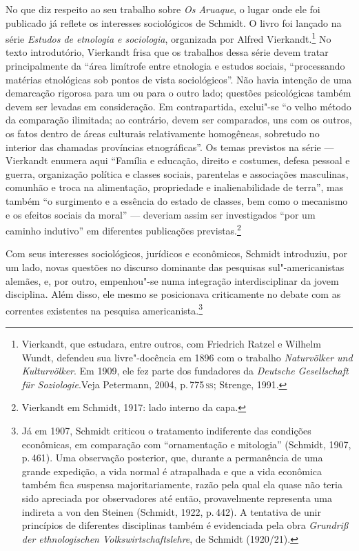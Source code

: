 No que diz respeito ao seu trabalho sobre \textit{Os Aruaque}, o lugar onde
ele foi publicado já reflete os interesses sociológicos de Schmidt. O
livro foi lançado na série \textit{Estudos de etnologia e sociologia}, organizada por
Alfred Vierkandt.\footnote{Vierkandt, que estudara, entre
  outros, com Friedrich Ratzel e Wilhelm Wundt, defendeu sua
  livre"-docência em 1896 com o trabalho \textit{Naturvölker und
  Kulturvölker}. Em 1909, ele
  fez parte dos fundadores da \textit{Deutsche Gesellschaft für
  Soziologie}.Veja Petermann, 2004, p.\,775\,\textsc{ss}; Strenge, 1991.} No texto introdutório, Vierkandt frisa que os
trabalhos dessa série devem tratar principalmente da ``área limítrofe
entre etnologia e estudos sociais,
``processando matérias etnológicas sob pontos de vista sociológicos''.
Não havia intenção de uma demarcação rigorosa para um ou para o outro
lado; questões psicológicas também devem ser levadas em consideração. Em
contrapartida, exclui"-se ``o velho método da comparação ilimitada; ao
contrário, devem ser comparados, uns com os outros, os fatos dentro de
áreas culturais relativamente homogêneas, sobretudo no interior das
chamadas províncias etnográficas''. Os temas previstos na série ---
Vierkandt enumera aqui ``Família e educação, direito e costumes, defesa
pessoal e guerra, organização política e classes sociais, parentelas e associações masculinas, comunhão e troca na
alimentação, propriedade e inalienabilidade de terra'', mas também ``o surgimento e a essência do estado de classes, bem como o mecanismo e os efeitos sociais da moral''
--- deveriam assim ser investigados ``por um caminho indutivo'' em
diferentes publicações previstas.\footnote{Vierkandt em Schmidt, 1917:
  lado interno da capa.}


Com seus interesses sociológicos, jurídicos e econômicos, Schmidt
introduziu, por um lado, novas questões no discurso dominante das
pesquisas sul"-americanistas alemães, e, por outro, empenhou"-se numa
integração interdisciplinar da jovem disciplina. Além disso, ele mesmo
se posicionava criticamente no debate com as correntes existentes na
pesquisa americanista.\footnote{Já em 1907, Schmidt criticou o
  tratamento indiferente das condições econômicas, em comparação com
  ``ornamentação e mitologia'' (Schmidt, 1907, p.\,461). Uma observação
  posterior, que, durante a permanência de uma grande expedição, a vida
  normal é atrapalhada e que a vida econômica também fica suspensa
  majoritariamente, razão pela qual ela quase não teria sido apreciada
  por observadores até então, provavelmente representa uma indireta a
  von den Steinen (Schmidt, 1922, p.\,442). A tentativa de unir
  princípios de diferentes disciplinas também é evidenciada pela obra
  \textit{Grundriß der ethnologischen Volkswirtschaftslehre}, de Schmidt (1920/21).}

